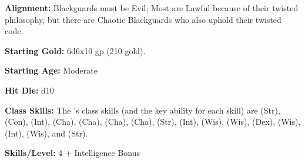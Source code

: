 


\textbf{Alignment:} Blackguards must be Evil; Most are Lawful because of their twisted philosophy, but there are Chaotic Blackguards who also uphold their twisted code.

\textbf{Starting Gold:} 6d6x10 gp (210 gold).

\textbf{Starting Age:} Moderate

\textbf{Hit Die:} d10

\textbf{Class Skills:} The \currentclassname{}'s class skills (and the key ability for each skill) are  (Str),  (Con),  (Int),  (Cha),  (Cha),  (Cha),  (Cha),  (Str),  (Int),  (Wis),  (Wis),  (Dex),  (Wis),  (Int),  (Wis), and  (Str).

\textbf{Skills/Level:} 4 + Intelligence Bonus

\goodbab{}
\goodfor{}
\poorref{}
\poorwil{}

